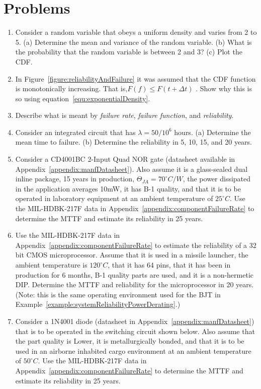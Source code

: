 \section{Problems}
\label{section:reliabilityProblems}

\begin{enumerate}
\def\labelenumi{\arabic{enumi}.}
\item
  Consider a random variable that obeys a uniform density and varies
  from 2 to 5. (a) Determine the mean and variance of the random
  variable. (b) What is the probability that the random variable is
  between 2 and 3? (c) Plot the CDF.

\item
  In Figure~\ref{figure:reliabilityAndFailure}
  it was assumed that the CDF function is monotonically
  increasing. That is,$F(f) \leq F(t+\Delta t)$ . Show why this is so using 
  equation~\ref{equ:exponentialDensity}.

\item
  Describe what is meant by \emph{failure rate}, \emph{failure
  function}, and \emph{reliability}.
\item
  Consider an integrated circuit that has $\lambda=50/10^6$ hours. 
  (a) Determine the mean time
  to failure. (b) Determine the reliability in 5, 10, 15, and 20 years.

\item
  Consider a CD4001BC 2-Input Quad NOR gate (datasheet available in
  Appendix~\ref{appendix:manfDatasheet}). Also assume it is a 
  glass-sealed dual inline package, 15
  years in production, $\Theta_{JA} = 70^\circ C/W$, the
  power dissipated in the application averages 10mW, it has B-1 quality,
  and that it is to be operated in laboratory equipment at an ambient
  temperature of $25^\circ C$. Use the MIL-HDBK-217F data in 
  Appendix~\ref{appendix:componentFailureRate} to
  determine the MTTF and estimate its reliability in 25 years.

\item
  Use the MIL-HDBK-217F data in 
  Appendix~\ref{appendix:componentFailureRate} to estimate the reliability
  of a 32 bit CMOS microprocessor. Assume that it is used in a missile
  launcher, the ambient temperature is $120^\circ C$, that it has 64 pins, that
  it has been in production for 6 months, B-1 quality parts are used,
  and it is a non-hermetic DIP. Determine the MTTF and reliability for
  the microprocessor in 20 years. (Note: this is the same operating
  environment used for the BJT in 
  Example~\ref{example:systemReliabilityPowerDerating}.)
\item
  Consider a 1N4001 diode (datasheet in 
  Appendix~\ref{appendix:manfDatasheet}) that is to be
  operated in the switching circuit shown below. Also assume that the
  part quality is Lower, it is metallurgically bonded, and that it is to
  be used in an airborne inhabited cargo environment at an ambient
  temperature of $50^\circ C$. Use the MIL-HDBK-217F data in 
  Appendix~\ref{appendix:componentFailureRate} to
  determine the MTTF and estimate its reliability in 25 years.


\end{enumerate}
